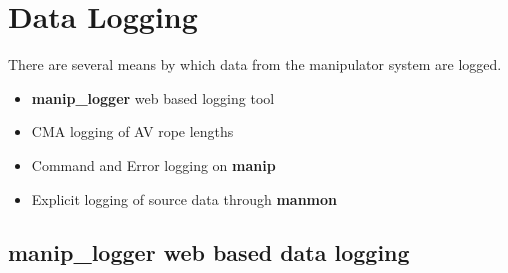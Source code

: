 
\chapter{Data Logging}
  
  There are several means by which data from the manipulator
system are logged.
\begin{itemize}
\item {\bf manip\_logger} web based logging tool
\item CMA logging of AV rope lengths
\item Command and Error logging on {\bf manip}
\item Explicit logging of source data through {\bf manmon}
\end{itemize}
   

\section{manip\_logger web based data logging}


